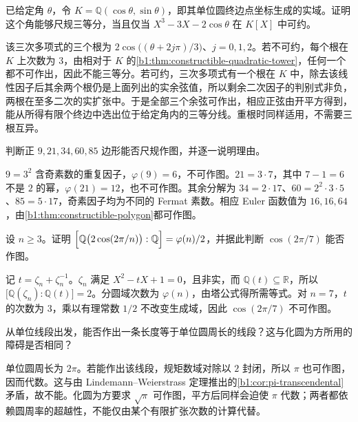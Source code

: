 \begin{exercise}\label{b1:ex:21-12}
	已给定角 \(\theta\)，令 \(K=\mathbb Q(\cos\theta,\sin\theta)\)，即其单位圆终边点坐标生成的实域。证明这个角能够尺规三等分，当且仅当 \(X^3-3X-2\cos\theta\) 在 \(K[X]\) 中可约。
\end{exercise}
\begin{solution}
	该三次多项式的三个根为 \(2\cos\bigl((\theta+2j\pi)/3\bigr)\)、\(j=0,1,2\)。若不可约，每个根在 \(K\) 上次数为 \(3\)，由相对于 \(K\) 的\cref{b1:thm:constructible-quadratic-tower}，任何一个都不可作出，因此不能三等分。若可约，三次多项式有一个根在 \(K\) 中，除去该线性因子后其余两个根仍是上面列出的实余弦值，所以剩余二次因子的判别式非负，两根在至多二次的实扩张中。于是全部三个余弦可作出，相应正弦由开平方得到，能从所得有限个终边中选出位于给定角内的三等分线。重根时同样适用，不需要三根互异。
\end{solution}

\begin{exercise}\label{b1:ex:21-13}
	判断正 \(9,21,34,60,85\) 边形能否尺规作图，并逐一说明理由。
\end{exercise}
\begin{solution}
	\(9=3^2\) 含奇素数的重复因子，\(\varphi(9)=6\)，不可作图。\(21=3\cdot7\)，其中 \(7-1=6\) 不是 \(2\) 的幂，\(\varphi(21)=12\)，也不可作图。其余分解为 \(34=2\cdot17\)、\(60=2^2\cdot3\cdot5\)、\(85=5\cdot17\)，奇素因子均为不同的 Fermat 素数。相应 Euler 函数值为 \(16,16,64\)，由\cref{b1:thm:constructible-polygon}都可作图。
\end{solution}

\begin{exercise}\label{b1:ex:21-14}
	设 \(n\geq3\)。证明 \(\Bigl[\mathbb Q\bigl(2\cos(2\pi/n)\bigr):\mathbb Q\Bigr]=\varphi(n)/2\)，并据此判断 \(\cos(2\pi/7)\) 能否作图。
\end{exercise}
\begin{solution}
	记 \(t=\zeta_n+\zeta_n^{-1}\)。\(\zeta_n\) 满足 \(X^2-tX+1=0\)，且非实，而 \(\mathbb Q(t)\subseteq\mathbb R\)，所以 \(\bigl[\mathbb Q(\zeta_n):\mathbb Q(t)\bigr]=2\)。分圆域次数为 \(\varphi(n)\)，由塔公式得所需等式。对 \(n=7\)，\(t\) 的次数为 \(3\)，乘以有理常数 \(1/2\) 不改变生成域，因此 \(\cos(2\pi/7)\) 不可作图。
\end{solution}

\begin{exercise}\label{b1:ex:21-15}
	从单位线段出发，能否作出一条长度等于单位圆周长的线段？这与化圆为方所用的障碍是否相同？
\end{exercise}
\begin{solution}
	单位圆周长为 \(2\pi\)。若能作出该线段，规矩数域对除以 \(2\) 封闭，所以 \(\pi\) 也可作图，因而代数。这与由 Lindemann--Weierstrass 定理推出的\cref{b1:cor:pi-transcendental}矛盾，故不能。化圆为方要求 \(\sqrt\pi\) 可作图，平方后同样会迫使 \(\pi\) 代数；两者都依赖圆周率的超越性，不能仅由某个有限扩张次数的计算代替。
\end{solution}



